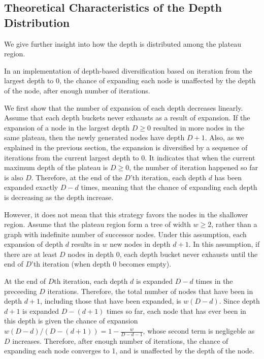 \subsection{Theoretical Characteristics of the Depth Distribution}

We give further insight into how the depth is distributed among the
plateau region.

\begin{theo}
 In an implementation of depth-based diversification based on iteration
 from the largest depth to 0, the chance of expanding each node is
 unaffected by the depth of the node, after enough number of iterations.
\end{theo}

We first show that the number of expansion of each depth decreases
linearly.  Assume that each depth buckets never exhausts as a result of
expansion.  If the expansion of a node in the largest depth $D\geq 0$ resulted
in more nodes in the same plateau, then the newly generated nodes have
depth $D+1$.  Also, as we explained in the previous section, the
expansion is diversified by a sequence of iterations from the current
largest depth to 0.  It indicates that when the current maximum depth of
the plateau is $D\geq 0$, the number of iteration happened so far is also $D$.
Therefore, at the end of the $D$'th iteration, each depth $d$ has
 been expanded exactly $D-d$ times, meaning that the chance of
expanding each depth is decreasing as the depth increase.

However, it does not mean that this strategy favors the nodes in the
shallower region.
 Assume that the plateau region form a tree of width
$w\geq 2$, rather than a graph with indefinite number of successor
nodes.  Under this assumption, each expansion of depth $d$ results in
$w$ new nodes in depth $d+1$. In this assumption, if there are at least
$D$ nodes in depth 0, each depth bucket never exhausts until the end of $D$'th
iteration (when depth 0 becomes empty).

At the end of $D$th iteration,
each depth $d$ is expanded $D-d$ times in the preceeding $D$ iterations.
Therefore, the total number of nodes that have been in depth $d+1$, including those
that have been expanded, is $w(D-d)$.
Since depth $d+1$ is expanded $D-(d+1)$ times so far,
each node that has ever been in this depth is given the chance of expansion
$w(D-d)/(D-(d+1))=1-\frac{w}{D-d-1}$, whose second term is
negligeble as $D$ increases.
Therefore, after enough number of iterations, the
chance of expanding each node converges to 1, and is unaffected by the depth of the node.

